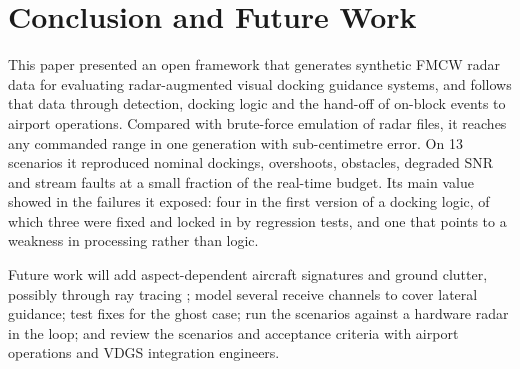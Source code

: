 \documentclass[conference]{IEEEtran}
\begin{document}
\section{Conclusion and Future Work}
\label{sec:conclusion}
This paper presented an open framework that generates synthetic FMCW radar data for evaluating radar-augmented visual docking guidance systems, and follows that data through detection, docking logic and the hand-off of on-block events to airport operations. Compared with brute-force emulation of radar files, it reaches any commanded range in one generation with sub-centimetre error. On 13 scenarios it reproduced nominal dockings, overshoots, obstacles, degraded SNR and stream faults at a small fraction of the real-time budget. Its main value showed in the failures it exposed: four in the first version of a docking logic, of which three were fixed and locked in by regression tests, and one that points to a weakness in processing rather than logic.

Future work will add aspect-dependent aircraft signatures and ground clutter, possibly through ray tracing \cite{radarsimpy}; model several receive channels to cover lateral guidance; test fixes for the ghost case; run the scenarios against a hardware radar in the loop; and review the scenarios and acceptance criteria with airport operations and VDGS integration engineers.



\end{document}
